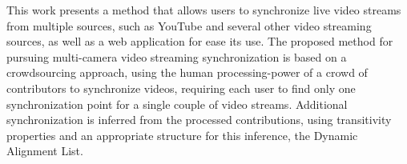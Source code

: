 This work presents a method that allows users to synchronize live video streams from multiple sources, such as YouTube and several other video streaming sources, as well as a web application for ease its use. The proposed method for pursuing multi-camera video streaming synchronization is based on a crowdsourcing approach, using the human processing-power of a crowd of contributors to synchronize videos, requiring each user to find only one synchronization point for a single couple of video streams. Additional synchronization is inferred from the processed contributions, using transitivity properties and an appropriate structure for this inference, the Dynamic Alignment List.